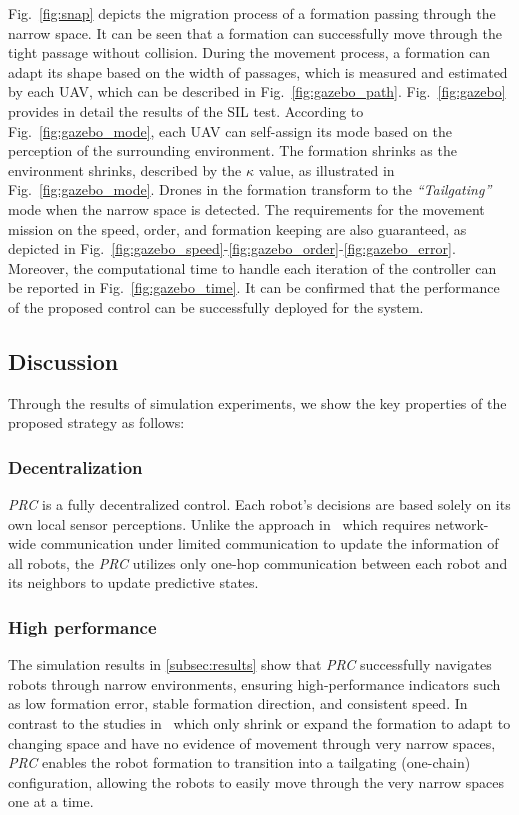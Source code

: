 Fig.~\ref{fig:snap} depicts the migration process of a formation passing through the narrow space. It can be seen that a formation can successfully move through the tight passage without collision. During the movement process, a formation can adapt its shape based on the width of passages, which is measured and estimated by each UAV, which can be described in Fig.~\ref{fig:gazebo_path}. Fig.~\ref{fig:gazebo} provides in detail the results of the SIL test. According to Fig.~\ref{fig:gazebo_mode}, each UAV can self-assign its mode based on the perception of the surrounding environment. The formation shrinks as the environment shrinks, described by the $\kappa$ value, as illustrated in Fig.~\ref{fig:gazebo_mode}. Drones in the formation transform to the \textit{``Tailgating''} mode when the narrow space is detected. The requirements for the movement mission on the speed, order, and formation keeping are also guaranteed, as depicted in Fig.~\ref{fig:gazebo_speed}-\ref{fig:gazebo_order}-\ref{fig:gazebo_error}. Moreover, the computational time to handle each iteration of the controller can be reported in Fig.~\ref{fig:gazebo_time}. It can be confirmed that the performance of the proposed control can be successfully deployed for the system.

\subsection{Discussion}
Through the results of simulation experiments, we show the  key properties of the proposed strategy as follows:

\subsubsection{Decentralization} \textit{PRC} is a fully decentralized control. Each robot's decisions are based solely on its own local sensor perceptions. Unlike the approach in~\cite{AlonsoMora2018} which requires network-wide communication under limited communication to update the information of all robots, the \textit{PRC} utilizes only one-hop communication between each robot and its neighbors to update predictive states.

\subsubsection{High performance}

The simulation results in \ref{subsec:results} show that \textit{PRC} successfully navigates robots through narrow environments, ensuring high-performance indicators such as low formation error, stable formation direction, and consistent speed. In contrast to the studies in~\cite{Elkilany2020,Vsrhelyi2018,Soria2021,AlonsoMora2018} which only shrink or expand the formation to adapt to changing space and have no evidence of movement through very narrow spaces, \textit{PRC} enables the robot formation to transition into a tailgating (one-chain) configuration, allowing the robots to easily move through the very narrow spaces one at a time.

